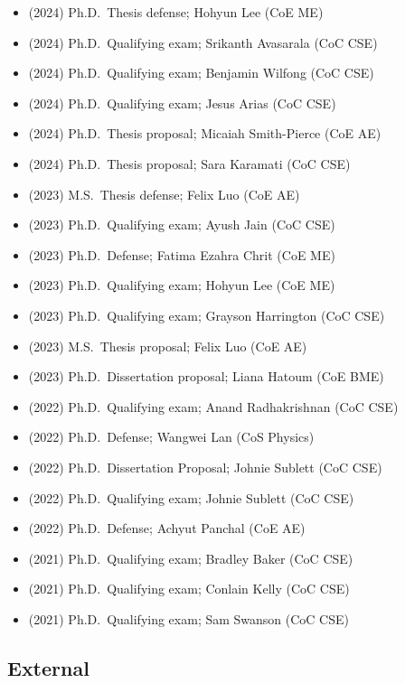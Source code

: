 \begin{itemize}
    \item (2024) Ph.D.\ Thesis defense; Hohyun Lee (CoE ME)
    \item (2024) Ph.D.\ Qualifying exam; Srikanth Avasarala (CoC CSE)
    \item (2024) Ph.D.\ Qualifying exam; Benjamin Wilfong (CoC CSE)
    \item (2024) Ph.D.\ Qualifying exam; Jesus Arias (CoC CSE)
    \item (2024) Ph.D.\ Thesis proposal; Micaiah Smith-Pierce (CoE AE)
    \item (2024) Ph.D.\ Thesis proposal; Sara Karamati (CoC CSE)
    \item (2023) M.S.\  Thesis defense; Felix Luo (CoE AE)
    \item (2023) Ph.D.\ Qualifying exam; Ayush Jain (CoC CSE)
    \item (2023) Ph.D.\ Defense; Fatima Ezahra Chrit (CoE ME)
    \item (2023) Ph.D.\ Qualifying exam; Hohyun Lee (CoE ME)
    \item (2023) Ph.D.\ Qualifying exam; Grayson Harrington (CoC CSE)
    \item (2023) M.S.\  Thesis proposal; Felix Luo (CoE AE)
    \item (2023) Ph.D.\ Dissertation proposal; Liana Hatoum (CoE BME)
    \item (2022) Ph.D.\ Qualifying exam; Anand Radhakrishnan (CoC CSE)
    \item (2022) Ph.D.\ Defense; Wangwei Lan (CoS Physics)
    \item (2022) Ph.D.\ Dissertation Proposal; Johnie Sublett (CoC CSE)
    \item (2022) Ph.D.\ Qualifying exam; Johnie Sublett (CoC CSE)
    \item (2022) Ph.D.\ Defense; Achyut Panchal (CoE AE)
    \item (2021) Ph.D.\ Qualifying exam; Bradley Baker (CoC CSE)
    \item (2021) Ph.D.\ Qualifying exam; Conlain Kelly (CoC CSE)
    \item (2021) Ph.D.\ Qualifying exam; Sam Swanson (CoC CSE)
\end{itemize}

\subsection{External}

